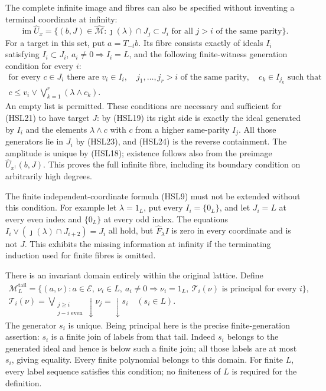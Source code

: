 The complete infinite image and fibres can also be specified
without inventing a terminal coordinate at infinity:
\begin{equation}\tag{HSL23}
 \operatorname{im}\widehat U_x
 =\{(b,J)\in\widehat{\mathcal M}:
       \jmath(\lambda)\cap J_j\subset J_i
           \text{ for all }j>i\text{ of the same parity}\}.
\end{equation}
For a target in this set, put $a=T_{-t}b$.
Its fibre consists exactly of ideals $I_i$ satisfying
$I_i\subset J_i$, $a_i\ne0\Rightarrow I_i=L$, and the following
finite-witness generation condition for every $i$:
\begin{equation}\tag{HSL24}
 \begin{gathered}
 \text{for every }c\in J_i\text{ there are }v_i\in I_i,\quad
 j_1,\ldots,j_r>i\text{ of the same parity},\quad
 c_k\in I_{j_k}\text{ such that}\\
 c\le v_i\vee\bigvee_{k=1}^{r}(\lambda\wedge c_k).
 \end{gathered}
\end{equation}
An empty list is permitted. These conditions are necessary
and sufficient for (HSL21) to have target $J$: by (HSL19)
its right side is exactly the ideal generated by $I_i$ and
the elements $\lambda\wedge c$ with $c$ from a higher
same-parity $I_j$. All those generators lie in $J_i$
by (HSL23), and (HSL24) is the reverse containment.
The amplitude is unique by (HSL18); existence follows also
from the preimage $\widehat U_{x^\dagger}(b,J)$.
This proves the full infinite fibre, including its boundary
condition on arbitrarily high degrees.

The finite independent-coordinate formula (HSL9) must not be
extended without this condition. For example let $\lambda=1_L$,
put every $I_i=\{0_L\}$, and let $J_i=L$ at every even index
and $\{0_L\}$ at every odd index. The equations
$I_i\vee(\jmath(\lambda)\cap J_{i+2})=J_i$ all hold,
but $\widehat F_\lambda I$ is zero in every coordinate and
is not $J$. This exhibits the missing information at infinity
if the terminating induction used for finite fibres is omitted.

There is an invariant domain entirely within the original
lattice. Define
\begin{equation}\tag{HSL25}
 \begin{gathered}
 \mathcal M_L^{\mathrm{tail}}
 =\{(a,\nu):a\in\mathcal E,\ \nu_i\in L,\
       a_i\ne0\Rightarrow\nu_i=1_L,\
       \mathcal T_i(\nu)\text{ is principal for every }i\},\\
 \mathcal T_i(\nu)=
      \bigvee_{\substack{j\ge i\\j-i\text{ even}}}
                      \downarrow\nu_j
       =\downarrow s_i\quad(s_i\in L).
 \end{gathered}
\end{equation}
The generator $s_i$ is unique. Being principal here is the
precise finite-generation assertion: $s_i$ is a finite join
of labels from that tail. Indeed $s_i$ belongs to the
generated ideal and hence is below such a finite join;
all those labels are at most $s_i$, giving equality.
Every finite polynomial belongs to this domain.
For finite $L$, every label sequence satisfies this condition;
no finiteness of $L$ is required for the definition.

